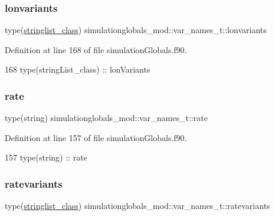 \subsubsection{\texorpdfstring{lonvariants}{lonvariants}}
{\footnotesize\ttfamily type(\mbox{\hyperlink{structsimulationglobals__mod_1_1stringlist__class}{stringlist\+\_\+class}}) simulationglobals\+\_\+mod\+::var\+\_\+names\+\_\+t\+::lonvariants\hspace{0.3cm}{\ttfamily [private]}}



Definition at line 168 of file simulation\+Globals.\+f90.


\begin{DoxyCode}
168         \textcolor{keywordtype}{type}(stringList\_class) :: lonVariants
\end{DoxyCode}
\mbox{\label{structsimulationglobals__mod_1_1var__names__t_aab01057392aff4cc99a78c4805965f74}} 
\subsubsection{\texorpdfstring{rate}{rate}}
{\footnotesize\ttfamily type(string) simulationglobals\+\_\+mod\+::var\+\_\+names\+\_\+t\+::rate\hspace{0.3cm}{\ttfamily [private]}}



Definition at line 157 of file simulation\+Globals.\+f90.


\begin{DoxyCode}
157         \textcolor{keywordtype}{type}(string) :: rate
\end{DoxyCode}
\mbox{\label{structsimulationglobals__mod_1_1var__names__t_a24f2e65af39e54fd03833d2284e1cc33}} 
\subsubsection{\texorpdfstring{ratevariants}{ratevariants}}
{\footnotesize\ttfamily type(\mbox{\hyperlink{structsimulationglobals__mod_1_1stringlist__class}{stringlist\+\_\+class}}) simulationglobals\+\_\+mod\+::var\+\_\+names\+\_\+t\+::ratevariants\hspace{0.3cm}{\ttfamily [private]}}



